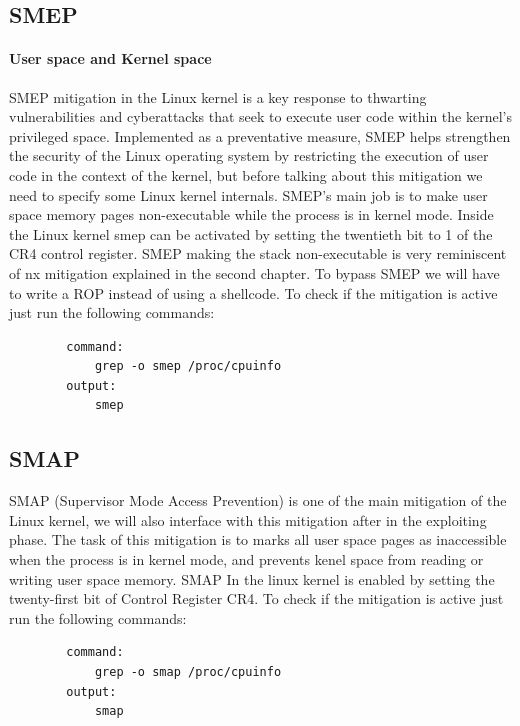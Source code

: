 \documentclass{report}
\begin{document}
    \subsection{SMEP}

    \paragraph{User space and Kernel space}

   SMEP mitigation in the Linux kernel is a key response to thwarting vulnerabilities and cyberattacks that seek to execute user code within the kernel's privileged space. Implemented as a preventative measure, SMEP helps strengthen the security of the Linux operating system by restricting the execution of user code in the context of the kernel, but before talking about this mitigation we need to specify some Linux kernel internals.\newline
    SMEP's main job is to make user space memory pages non-executable while the process is in kernel mode. Inside the Linux kernel smep can be activated by setting the twentieth bit to 1 of the CR4 control register.\newline
    SMEP making the stack non-executable is very reminiscent of nx mitigation explained in the second chapter.\newline
    To bypass SMEP we will have to write a ROP instead of using a shellcode.\newline 
    To check if the mitigation is active just run the following commands: \newline
        \begin{verbatim}
        command:
            grep -o smep /proc/cpuinfo
        output: 
            smep
    \end{verbatim}
    \subsection{SMAP}
    SMAP (Supervisor Mode Access Prevention) is one of the main mitigation of the Linux kernel, we will also interface with this mitigation after in the exploiting phase.\newline
    The task of this mitigation is to marks all user space pages as inaccessible when the process is in kernel mode, and prevents kenel space from reading or writing user space memory.\newline
    SMAP In the linux kernel is enabled by setting the twenty-first bit of Control Register CR4.\newline
    To check if the mitigation is active just run the following commands: \newline
      \begin{verbatim}
        command:
            grep -o smap /proc/cpuinfo
        output: 
            smap
    \end{verbatim}
\end{document}
